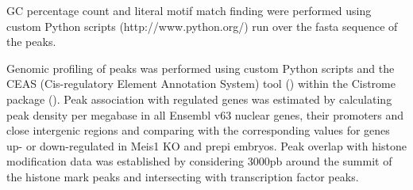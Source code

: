 GC percentage count and literal motif match finding were performed using custom Python scripts (http://www.python.org/) run over the fasta sequence of the peaks.

Genomic profiling of peaks was performed using custom Python scripts and the CEAS (Cis-regulatory Element Annotation System) tool (\cite{Shin2009}) within the Cistrome package (\cite{Liu2011}). Peak association with regulated genes was estimated by calculating peak density per megabase in all Ensembl v63 nuclear genes, their promoters and close intergenic regions and comparing with the corresponding values for genes up- or down-regulated in Meis1 \ac{KO} and \ac{prepi} embryos. Peak overlap with histone modification data was established by considering 3000pb around the summit of the histone mark peaks and intersecting with transcription factor peaks.
